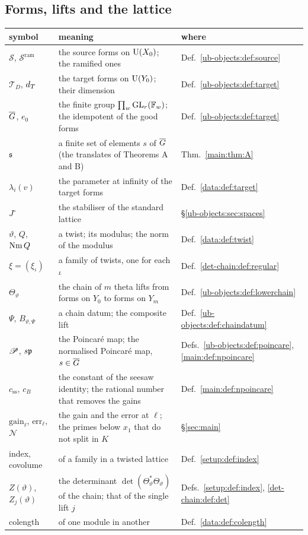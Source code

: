 \subsection*{Forms, lifts and the lattice}

\begin{center}\small
\begin{tabular}{@{}l p{} l@{}}
\toprule
symbol & meaning & where \\
\midrule
$\mathcal{S}$, $\mathcal{S}^{\mathrm{ram}}$ & the source forms on $\operatorname{U}(X_0)$; the ramified ones & Def.~\ref{ub-objects:def:source} \\
$\mathcal{T}_D$, $d_T$ & the target forms on $\operatorname{U}(Y_0)$; their dimension & Def.~\ref{ub-objects:def:target} \\
$\overline{G}$, $e_0$ & the finite group $\prod_w \operatorname{GL}_r(\mathbb{F}_w)$; the idempotent of the good forms & Def.~\ref{ub-objects:def:target} \\
$\mathfrak{s}$ & a finite set of elements $s$ of $\overline{G}$ (the translates of Theorems A and B) & Thm.~\ref{main:thm:A} \\
$\lambda_i(v)$ & the parameter at infinity of the target forms & Def.~\ref{data:def:target} \\
$J^\circ$ & the stabiliser of the standard lattice & \S\ref{ub-objects:sec:spaces} \\
$\vartheta$, $Q$, $\operatorname{Nm} Q$ & a twist; its modulus; the norm of the modulus & Def.~\ref{data:def:twist} \\
$\xi = (\xi_\iota)$ & a family of twists, one for each $\iota$ & Def.~\ref{det-chain:def:regular} \\
$\Theta_\vartheta$ & the chain of $m$ theta lifts from forms on $Y_0$ to forms on $Y_m$ & Def.~\ref{ub-objects:def:lowerchain} \\
$\Psi$, $B_{\vartheta,\Psi}$ & a chain datum; the composite lift & Def.~\ref{ub-objects:def:chaindatum} \\
$\mathscr{P}$, $s\mathfrak{p}$ & the Poincar\'e map; the normalised Poincar\'e map, $s \in \overline{G}$ & Defs.~\ref{ub-objects:def:poincare}, \ref{main:def:npoincare} \\
$c_{\mathrm{ss}}$, $c_B$ & the constant of the seesaw identity; the rational number that removes the gains & Def.~\ref{main:def:npoincare} \\
$\mathrm{gain}_\ell$, $\mathrm{err}_\ell$, $\mathcal{N}$ & the gain and the error at $\ell$; the primes below $x_1$ that do not split in $K$ & \S\ref{sec:main} \\
index, covolume & of a family in a twisted lattice & Def.~\ref{setup:def:index} \\
$Z(\vartheta)$, $Z_j(\vartheta)$ & the determinant $\det(\Theta_\vartheta^*\Theta_\vartheta)$ of the chain; that of the single lift $j$ & Defs.~\ref{setup:def:index}, \ref{det-chain:def:det} \\
colength & of one module in another & Def.~\ref{data:def:colength} \\
\bottomrule
\end{tabular}
\end{center}
